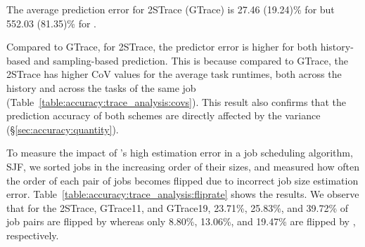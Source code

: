 {
{The average prediction error for 2STrace (GTrace) is 27.46 (19.24)\% for \namepredict
but 552.03 (81.35)\%} for \primarybasepredict.
\fi


Compared to GTrace,  for 2STrace,
the predictor error is higher for both history-based and sampling-based
prediction. This is because
compared to GTrace, the 2STrace has higher CoV values for
the average task runtimes, both across the history and across the tasks of
the same job (Table~\ref{table:accuracy:trace_analysis:covs}). This result
also confirms that the prediction accuracy of both schemes are directly affected by 
the variance (\S\ref{sec:accuracy:quantity}).


{To measure the impact of \primarybasepredict's high estimation error in
a job scheduling algorithm, \eg SJF, 
we sorted jobs in the increasing order of their sizes, and measured how often
the order of each pair of jobs becomes flipped due to incorrect job size
estimation error.  Table~\ref{table:accuracy:trace_analysis:fliprate} shows the
results.  We observe that for the 2STrace, GTrace11, and GTrace19, 23.71\%,
25.83\%, and 39.72\% of job pairs are flipped by \primarybasepredict whereas
only 8.80\%, 13.06\%, and 19.47\% are flipped by \name, respectively.

}

}
